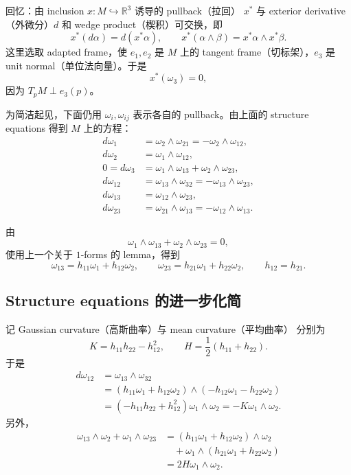 \documentclass[UTF8,11pt,a4paper]{ctexart}
\begin{document}
回忆：由 inclusion $x\colon M\hookrightarrow\mathbb{R}^3$ 诱导的 pullback（拉回） $x^*$ 与 exterior derivative（外微分）$d$ 和 wedge product（楔积）可交换，即
\[
x^*(d\alpha)=d(x^*\alpha),\qquad
x^*(\alpha\wedge\beta)=x^*\alpha\wedge x^*\beta.
\]
这里选取 adapted frame，使 $e_1,e_2$ 是 $M$ 上的 tangent frame（切标架），$e_3$ 是 unit normal（单位法向量）。于是
\[
x^*(\omega_3)=0,
\]
因为 $T_pM\perp e_3(p)$。

为简洁起见，下面仍用 $\omega_i,\omega_{ij}$ 表示各自的 pullback。由上面的 structure equations 得到 $M$ 上的方程：
\begin{align*}
d\omega_1&=\omega_2\wedge\omega_{21}
          =-\omega_2\wedge\omega_{12},\\
d\omega_2&=\omega_1\wedge\omega_{12},\\
0=d\omega_3&=\omega_1\wedge\omega_{13}+\omega_2\wedge\omega_{23},\\
d\omega_{12}&=\omega_{13}\wedge\omega_{32}
             =-\omega_{13}\wedge\omega_{23},\\
d\omega_{13}&=\omega_{12}\wedge\omega_{23},\\
d\omega_{23}&=\omega_{21}\wedge\omega_{13}
             =-\omega_{12}\wedge\omega_{13}.
\end{align*}

由
\[
\omega_1\wedge\omega_{13}+\omega_2\wedge\omega_{23}=0,
\]
使用上一个关于 $1$-forms 的 lemma，得到
\[
\omega_{13}=h_{11}\omega_1+h_{12}\omega_2,
\qquad
\omega_{23}=h_{21}\omega_1+h_{22}\omega_2,
\qquad h_{12}=h_{21}.
\]

\subsection*{Structure equations 的进一步化简}
记 Gaussian curvature（高斯曲率）与 mean curvature（平均曲率） 分别为
\[
K=h_{11}h_{22}-h_{12}^2,
\qquad H=\frac12(h_{11}+h_{22}).
\]
于是
\begin{align*}
d\omega_{12}
&=\omega_{13}\wedge\omega_{32}\\
&=(h_{11}\omega_1+h_{12}\omega_2)
\wedge(-h_{12}\omega_1-h_{22}\omega_2)\\
&=(-h_{11}h_{22}+h_{12}^2)\omega_1\wedge\omega_2
=-K\omega_1\wedge\omega_2.
\end{align*}
另外，
\begin{align*}
\omega_{13}\wedge\omega_2+\omega_1\wedge\omega_{23}
&=(h_{11}\omega_1+h_{12}\omega_2)\wedge\omega_2\\
&\quad+\omega_1\wedge(h_{21}\omega_1+h_{22}\omega_2)\\
&=2H\omega_1\wedge\omega_2.
\end{align*}
\end{document}
